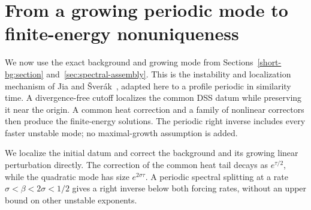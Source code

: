 \section{From a growing periodic mode to finite-energy nonuniqueness}
\label{sec:localization}

\ifdefined\CompleteCandidate
We now use the exact background and growing mode from
Sections~\ref{short-bg:section} and~\ref{sec:spectral-assembly}. This is the instability
and localization mechanism of Jia and \v Sver\'ak~\cite{jia-sverak2015},
adapted here to a profile periodic in similarity time. A divergence-free
cutoff localizes the common DSS datum while preserving it near the
origin. A common heat correction and a family of nonlinear correctors then
produce the finite-energy solutions. The periodic right inverse includes
every faster unstable mode; no maximal-growth assumption is added.
\fi

We localize the initial datum and correct the background and its growing
linear perturbation directly. The correction of the common heat tail
decays as $e^{\tau/2}$, while the quadratic mode has size
$e^{2\sigma\tau}$. A periodic spectral splitting at a rate
$\sigma<\beta<2\sigma<1/2$ gives a right inverse below both forcing
rates, without an upper bound on other unstable exponents.

